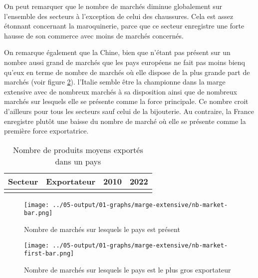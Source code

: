 \documentclass[french,10pt,a4paper]{article}
\begin{document}
On peut remarquer que le nombre de marchés diminue globalement sur l'ensemble des secteurs à l'exception de celui des chaussures. Cela est assez étonnant concernant la maroquinerie, parce que ce secteur enregistre une forte hausse de son commerce avec moins de marchés concernés.

On remarque également que la Chine, bien que n'étant pas présent sur un nombre aussi grand de marchés que les pays européens ne fait pas moins bienq qu'eux en terme de nombre de marchés où elle dispose de la plus grande part de marchés (voir figure \ref{fig:nb-market-first-bar}). l'Italie semble être la championne dans la marge extensive avec de nombreux marchés à sa disposition ainsi que de nombreux marchés sur lesquels elle se présente comme la force principale. Ce nombre croit d'ailleurs pour tous les secteurs sauf celui de la bijouterie. Au contraire, la France enregistre plutôt une baisse du nombre de marché où elle se présente comme la première force exportatrice.

\begin{table}[ht]
  \centering
  \begin{tabular}{lrrr}
    \hline
   Secteur & Exportateur & 2010 & 2022 \\
    \hline
    \\
    \hline
  \end{tabular}
  \caption{Nombre de produits moyens exportés dans un pays}
  \label{tab:table-nb-mean-product-export}
\end{table}

\begin{figure}[!h]
  \centering
  \texttt{[image: ../05-output/01-graphs/marge-extensive/nb-market-bar.png]}
  \caption{Nombre de marchés sur lesquels le pays est présent}
  \label{fig:nb-market-bar}
\end{figure}

\begin{figure}[!h]
  \centering  \texttt{[image: ../05-output/01-graphs/marge-extensive/nb-market-first-bar.png]}
  \caption{Nombre de marchés sur lesquels le pays est le plus gros exportateur}
  \label{fig:nb-market-first-bar}
\end{figure}
\end{document}
